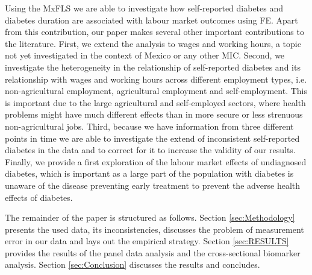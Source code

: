 Using the \ac{MxFLS} we are able to investigate
how self-reported diabetes and diabetes duration are associated with
labour market outcomes using \ac{FE}. Apart from this contribution, our paper makes
several other important contributions to the literature. First, we
extend the analysis to wages and working hours, a topic not yet investigated
in the context of Mexico or any other \ac{MIC}. Second, we investigate the heterogeneity
in the relationship of self-reported diabetes and its relationship
with wages and working hours across different employment types, i.e.
non-agricultural employment, agricultural employment and self-employment.
This is important due to the large agricultural and self-employed
sectors, where health problems might have much different effects than
in more secure or less strenuous non-agricultural jobs. Third, because
we have information from three different points in time we are able
to investigate the extend of inconsistent self-reported diabetes in
the data and to correct for it to increase the validity of our results.
Finally, we provide a first exploration of the labour market effects
of undiagnosed diabetes, which is important as a large part of the
population with diabetes is unaware of the disease preventing early
treatment to prevent the adverse health effects of diabetes.

The remainder of the paper is structured as follows. Section \ref{sec:Methodology}
presents the used data, its inconsistencies, discusses the problem
of measurement error in our data and lays out the empirical strategy.
Section \ref{sec:RESULTS} provides the results of the panel data
analysis and the cross-sectional biomarker analysis. Section \ref{sec:Conclusion}
discusses the results and concludes.

